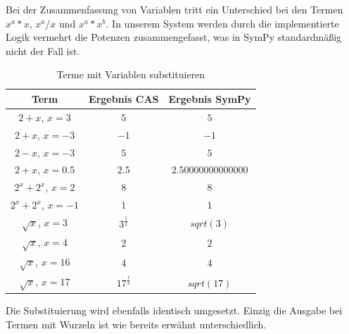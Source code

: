 \documentclass[11pt,a4paper, ngerman]{article}
\begin{document}
Bei der Zusammenfassung von Variablen tritt ein Unterschied bei den Termen $x^a*x$, $x^a/x$ und $x^a*x^b$. In unserem System werden durch die implementierte Logik vermehrt die Potenzen zusammengefasst, was in SymPy standardmäßig nicht der Fall ist.

\begin{table}[h!]
    \caption{Terme mit Variablen substituieren}
    \centering
    \begin{tabular}{|c|c|c|}
        \hline
        \textbf{Term} & \textbf{Ergebnis CAS} & \textbf{Ergebnis SymPy} \\
        \hline
        $2+x$, $x=3$ & $5$ & $5$ \\
        \hline
        $2+x$, $x=-3$ & $-1$ & $-1$ \\
        \hline
        $2-x$, $x=-3$ & $5$ & $5$ \\
        \hline
        $2+x$, $x=0.5$ & $2.5$ & $2.50000000000000$ \\
        \hline
        $2^{x} + 2^{x}$, $x=2$ & $8$ & $8$ \\
        \hline
        $2^{x} + 2^{x}$, $x=-1$ & $1$ & $1$ \\
        \hline
        $\sqrt{x}$, $x=3$ & $3^{\frac{1}{2}}$ & $sqrt(3)$ \\
        \hline
        $\sqrt{x}$, $x=4$ & $2$ & $2$ \\
        \hline
        $\sqrt{x}$, $x=16$ & $4$ & $4$ \\
        \hline
        $\sqrt{x}$, $x=17$ & $17^{\frac{1}{2}}$ & $sqrt(17)$ \\
        \hline
    \end{tabular}
\end{table}

Die Substituierung wird ebenfalls identisch umgesetzt. Einzig die Ausgabe bei Termen mit Wurzeln ist wie bereits erwähnt unterschiedlich.
\end{document}
